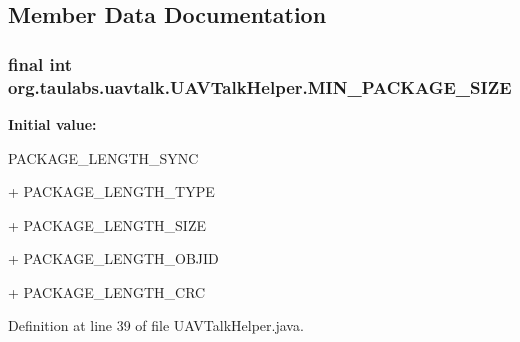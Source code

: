 \subsection{\-Member \-Data \-Documentation}
\hypertarget{classorg_1_1taulabs_1_1uavtalk_1_1_u_a_v_talk_helper_acca7dfc119249e6cd79ce3f4f2a0c980}{
\subsubsection[{\-M\-I\-N\-\_\-\-P\-A\-C\-K\-A\-G\-E\-\_\-\-S\-I\-Z\-E}]{\setlength{\rightskip}{0pt plus 5cm}final int {\bf org.\-taulabs.\-uavtalk.\-U\-A\-V\-Talk\-Helper.\-M\-I\-N\-\_\-\-P\-A\-C\-K\-A\-G\-E\-\_\-\-S\-I\-Z\-E}}}\label{classorg_1_1taulabs_1_1uavtalk_1_1_u_a_v_talk_helper_acca7dfc119249e6cd79ce3f4f2a0c980}
{\bfseries \-Initial value\-:}
\begin{DoxyCode}
PACKAGE_LENGTH_SYNC 
                                                                                
          + PACKAGE_LENGTH_TYPE 
                                                                                
          + PACKAGE_LENGTH_SIZE 
                                                                                
          + PACKAGE_LENGTH_OBJID
                                                                                
          + PACKAGE_LENGTH_CRC
\end{DoxyCode}


\-Definition at line 39 of file \-U\-A\-V\-Talk\-Helper.\-java.

